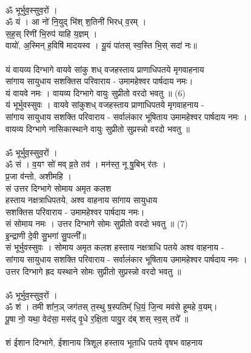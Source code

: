 \\
ॐ भूर्भुव॒स्सुव॒रों ।\\
{\small ॐ} यं । आ नो॑ नि॒युद् भि॑श् श॒तिनी॑ भिरध् व॒रम् । \\
स॒ह॒स् रिणी॑ भि॒रुप॑ याहि य॒ज्ञम् ।\\
वायो॑, अ॒स्मिन् ह॒विषि॑ मादयस्व । यू॒यं पा॑तस् स्व॒स्ति भि॒स् सदा॑ नः॥\\
\\
यं वायव्य दिग्भागे वायवे सांकु शध् वजहस्ताय प्राणाधिपतये मृगवाहनाय\\
सांगाय सायुधाय सशक्तिस परिवाराय -  उमामहेश्वर पार्षदाय नमः।\\
यं वायवे नमः । वायव्य दिग्भागे  वायुः सुप्रीतो  वरदो भवतु ॥ (6)\\
{\small यं भूर्भुवस्सुवः । वायवे सांकुशध् वजहस्ताय प्राणाधिपतये मृगवाहनाय -\\
सांगाय सायुधाय सशक्ति परिवाराय - सर्वालंकार भूषिताय उमामहेश्वर पार्षदाय नमः ।\\
वायव्य दिग्भागे नासिकास्थाने वायुः सुप्रीतो सुप्रस्न्नो वरदो भवतु ॥}\\
\\
ॐ भूर्भुव॒स्सुव॒रों ।\\
{\small ॐ} सं । व॒यꣳ सो॑ मव् व्र॒ते तव॑ । मन॑स्त॒ नू षु॒बिभ् र॑तः ।\\
प्र॒जा व॑न्तो, अशीमहि ।\\
सं उत्तर दिग्भागे सोमाय अमृत कलश \\
हस्ताय नक्षत्राधिपतये, अश्व वाहनाय सांगाय सायुधाय \\
सशक्तिस परिवाराय - उमामहेश्वर पार्षदाय नमः।\\
सं सोमाय नमः । उत्तर दिग्भागे  सोमः सुप्रीतो वरदो भवतु ॥ (7)\\
{\small इ॒न्द्राणी दे॒वी सु॒भगा॑ सु॒पत्नी᳚॥\\
सं भूर्भुवस्सुवः । सोमाय अमृत कलश हस्ताय नक्षत्राधि पतये अश्व वाहनाय -\\
सांगाय सायुधाय सशक्ति परिवाराय - सर्वालंकार भूषिताय उमामहेश्वर पार्षदाय नमः ।\\
उत्तर दिग्भागे ह्रद यस्थाने सोमः सुप्रीतो सुप्रस्न्नो वरदो भवतु ॥}\\
\\
ॐ भूर्भुव॒स्सुव॒रों ।\\
{\small ॐ} शं । तमी शा᳚न॒ञ् जग॑तस् त॒स्थु ष॒स्पतिम्᳚ धि॒यं॒ जि॒न्व मव॑से हूमहे व॒यम्।\\
पू॒षा नो॒ यथा॒ वेद॑सा॒ मस॑द् वृ॒धे र॒क्षि॒ता पायु॒र द॑ब् शस् स्व॒स् तये᳚ ॥\\
\\
शं ईशान दिग्भागे, ईशानाय त्रिशूल हस्ताय भूताधि पतये वृषभ वाहनाय\\
